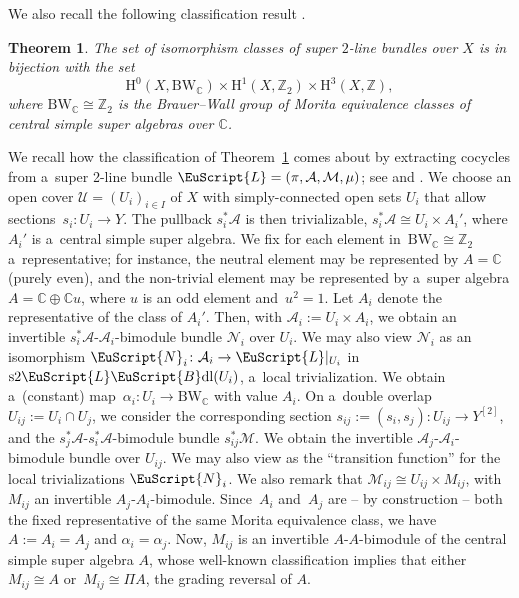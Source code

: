 \documentclass[pdftex]{sigma}
\numberwithin{equation}{section}
\newtheorem{Theorem}{Theorem}[section]
\def\mathscr#1{\EuScript{#1}}
\def\Z {\mathbb{Z}}
\def\C {\mathbb{C}}
\def\h {\mathrm{H}}
\newcommand{\LineBdl}{\mathscr{L}\mathscr{B}\mathrm{dl}}
\newcommand{\stwoLineBdl}{\mathrm{s}2\LineBdl}
\begin{document}
We also recall the following classification result \cite[Theorem~4.4.4]{Kristel2020}.

\begin{Theorem}
\label{super-2-line-bundles}
The set of isomorphism classes of super $2$-line bundles over $X$ is in bijection with the set
\begin{equation*}
\h^0(X,\mathrm{BW}_\C) \times \h^1(X,\Z_2) \times \h^3(X,\Z),
\end{equation*}
where $\mathrm{BW}_\C\cong \Z_2$ is the Brauer--Wall group of Morita equivalence classes of central simple super algebras over $\C$.
\end{Theorem}

\begin{Remark}
\label{extracting-cocycle}
We recall how the classification of Theorem~\ref{super-2-line-bundles} comes about by extracting cocycles from a~super 2-line bundle $\mathscr{L}=(\pi,\mathcal{A},\mathcal{M},\mu)$; see \cite[Section~4]{Kristel2020} and \cite[Section~2.2]{Mertsch2020}. We choose an open cover $\mathcal{U}=(U_i)_{i\in I}$ of $X$ with simply-connected open sets $U_i$ that allow sections~${s_i\colon U_i \to Y}$.
The pullback $s_i^{*}\mathcal{A}$ is then trivializable, $s_i^{*}\mathcal{A} \cong U_i \times A_i'$, where $A_i'$ is a~central simple super algebra. We fix for each element in~$\mathrm{BW}_{\C}\cong \Z_2$ a~representative; for instance, the neutral element may be represented by $A=\C$ (purely even), and the non-trivial element may be represented by a~super algebra $A=\C \oplus \C u$, where $u$ is an odd element and~${u^2=1}$.
 Let $A_i$ denote the representative of the class of $A_i'$. Then, with $\mathcal{A}_i:=U_i \times A_i$, we obtain an invertible $s_i^{*}\mathcal{A}$-$\mathcal{A}_i$-bimodule bundle $\mathcal{N}_i$ over $U_i$. We may also view $\mathcal{N}_i$ as an isomorphism $\mathscr{N}_i\colon \mathcal{A}_i \to \mathscr{L}|_{U_i}$ in~$\stwoLineBdl(U_i)$, a~local trivialization. We obtain a~(constant) map~${\alpha_i\colon U_i \to \mathrm{BW}_{\C}}$ with value $A_i$.
On a~double overlap $U_{ij} :=U_i \cap U_j$, we consider the corresponding section $s_{ij} := (s_i,s_j)\colon U_{ij} \to Y^{[2]}$, and the $s_j^{*}\mathcal{A}$-$s_i^{*}\mathcal{A}$-bimodule bundle $s_{ij}^{*}\mathcal{M}$.
 We obtain the invertible $\mathcal{A}_j$-$\mathcal{A}_i$-bimodule bundle  over $U_{ij}$.
 We may also view \smash{$\mathcal{M}_{ij} = \mathscr{N}_j^{-1} \circ \mathscr{N}_i\colon \mathcal{A}_i \to \mathcal{A}_j$} as the ``transition function'' for the local trivializations $\mathscr{N}_i$. We also remark that $\mathcal{M}_{ij} \cong U_{ij}\times M_{ij}$, with $M_{ij}$ an invertible $A_j$-$A_i$-bimodule. Since~$A_i$ and~$A_j$ are -- by construction -- both the fixed representative of the same Morita equivalence class, we have $A:=A_i=A_j$ and $\alpha_i = \alpha_j$. Now, $M_{ij}$ is an invertible $A$-$A$-bimodule of the central simple super algebra $A$, whose well-known classification implies that either $M_{ij}\cong A$ or~${M_{ij} \cong \Pi A}$, the grading reversal of $A$.

\end{Remark}
\end{document}
